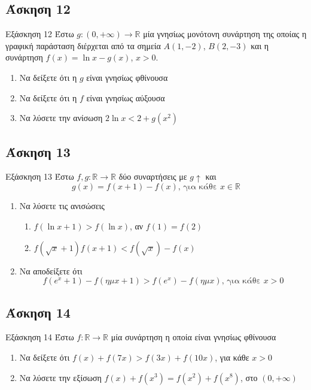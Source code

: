 \documentclass[greek]{beamer}
\begin{document}
\subsection{Άσκηση 12}
\begin{frame}[label=Άσκηση12,t]{Εξάσκηση 12}
      Έστω $g:(0,+\infty)\to\mathbb{R}$ μία γνησίως μονότονη συνάρτηση της οποίας η γραφική παράσταση διέρχεται από τα σημεία $Α(1,-2)$, $Β(2,-3)$ και η συνάρτηση $f(x)=\ln x-g(x)$, $x>0$.
      \begin{enumerate}
            \item Να δείξετε ότι η $g$ είναι γνησίως φθίνουσα \pause
            \item Να δείξετε ότι η $f$ είναι γνησίως αύξουσα \pause
            \item Να λύσετε την ανίσωση $2\ln x<2+g(x^2)$
      \end{enumerate}
\end{frame}

\subsection{Άσκηση 13}
\begin{frame}[label=Άσκηση13,t]{Εξάσκηση 13}
      Έστω $f,g:\mathbb{R}\to\mathbb{R}$ δύο συναρτήσεις με $g\uparrow$ και
      $$g(x)=f(x+1)-f(x)\text{, για κάθε } x\in\mathbb{R}$$
      \begin{enumerate}
            \item Να λύσετε τις ανισώσεις
                  \begin{enumerate}
                        \item $f(\ln x+1)>f(\ln x)$, αν $f(1)=f(2)$ \pause
                        \item $f(\sqrt{x}+1)f(x+1)<f(\sqrt{x})-f(x)$ \pause
                  \end{enumerate}
            \item Να αποδείξετε ότι
                  $$f(e^x+1)-f(ημ x+1)>f(e^x)-f(ημ x)\text{, για κάθε } x>0$$
      \end{enumerate}
\end{frame}

\subsection{Άσκηση 14}
\begin{frame}[label=Άσκηση14,t]{Εξάσκηση 14}
      Έστω $f:\mathbb{R}\to\mathbb{R}$ μία συνάρτηση η οποία είναι γνησίως φθίνουσα
      \begin{enumerate}
            \item Να δείξετε ότι $f(x)+f(7x)>f(3x)+f(10x)$, για κάθε $x>0$ \pause
            \item Να λύσετε την εξίσωση $f(x)+f(x^3)=f(x^2)+f(x^8)$, στο $(0,+\infty)$
      \end{enumerate}
\end{frame}
\end{document}
